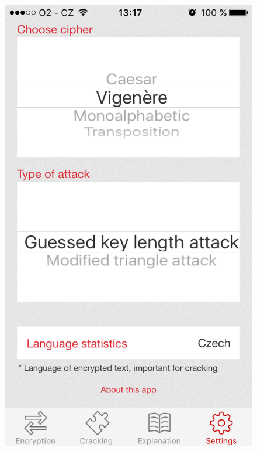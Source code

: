\documentclass[glossaries, index]{kidiplom}
\begin{document}
\begin{figure}[htbp]
\centering
\includegraphics[scale=0.3]{graphics/app/settings.png}\qquad 

\end{figure}
\end{document}
